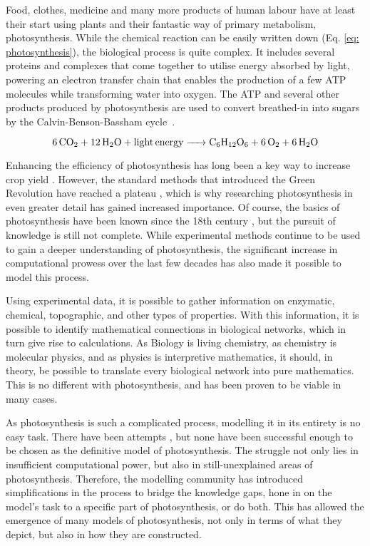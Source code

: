 \documentclass[11pt]{article}
\begin{document}


\newpage

\noindent
Food, clothes, medicine and many more products of human labour have at least their start using plants and their fantastic way of primary metabolism, photosynthesis. While the chemical reaction can be easily written down (Eq. \ref{eq: photosynthesis}), the biological process is quite complex. It includes several proteins and complexes that come together to utilise energy absorbed by light, powering an electron transfer chain that enables the production of a few ATP molecules while transforming water into oxygen. The ATP and several other products produced by photosynthesis are used to convert breathed-in  into sugars by the Calvin-Benson-Bassham cycle~\parencite{stirbet_photosynthesis_2020}.

\begin{equation}
    \label{eq: photosynthesis}
    \ce{6CO2 + 12H2O + light energy -> C6H12O6 + 6O2 + 6H2O}
\end{equation}

Enhancing the efficiency of photosynthesis has long been a key way to increase crop yield \parencite{murchie_agriculture_2009}. However, the standard methods that introduced the Green Revolution have reached a plateau \parencite{long_can_2006}, which is why researching photosynthesis in even greater detail has gained increased importance. Of course, the basics of photosynthesis have been known since the 18th century \parencite{ingenhousz_experiments_1779}, but the pursuit of knowledge is still not complete. While experimental methods continue to be used to gain a deeper understanding of photosynthesis, the significant increase in computational prowess over the last few decades has also made it possible to model this process.

Using experimental data, it is possible to gather information on enzymatic, chemical, topographic, and other types of properties. With this information, it is possible to identify mathematical connections in biological networks, which in turn give rise to calculations. As Biology is living chemistry, as chemistry is molecular physics, and as physics is interpretive mathematics, it should, in theory, be possible to translate every biological network into pure mathematics. This is no different with photosynthesis, and has been proven to be viable in many cases.

As photosynthesis is such a complicated process, modelling it in its entirety is no easy task. There have been attempts \parencite{zhu_ephotosynthesis_2013}, but none have been successful enough to be chosen as the definitive model of photosynthesis. The struggle not only lies in insufficient computational power, but also in still-unexplained areas of photosynthesis. Therefore, the modelling community has introduced simplifications in the process to bridge the knowledge gaps, hone in on the model's task to a specific part of photosynthesis, or do both. This has allowed the emergence of many models of photosynthesis, not only in terms of what they depict, but also in how they are constructed.
\end{document}
